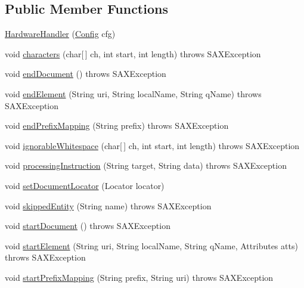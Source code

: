 \subsection*{Public Member Functions}
\begin{DoxyCompactItemize}
\item 
\hyperlink{classrob_o_s2_1_1xml_1_1handler_1_1_hardware_handler_aa8514b593a0c7be3522a4b004e7e2e4e}{HardwareHandler} (\hyperlink{classrob_o_s2_1_1serial_1_1_config}{Config} cfg)
\item 
void \hyperlink{classrob_o_s2_1_1xml_1_1handler_1_1_hardware_handler_a60a7c7ba374796c2732fdbdf9ddd7f20}{characters} (char\mbox{[}$\,$\mbox{]} ch, int start, int length)  throws SAXException 
\item 
void \hyperlink{classrob_o_s2_1_1xml_1_1handler_1_1_hardware_handler_a9007e3b376b3c8a12af0e14ba15040e7}{endDocument} ()  throws SAXException 
\item 
void \hyperlink{classrob_o_s2_1_1xml_1_1handler_1_1_hardware_handler_a431b96e478c956f8f794e2034914ed4e}{endElement} (String uri, String localName, String qName)  throws SAXException 
\item 
void \hyperlink{classrob_o_s2_1_1xml_1_1handler_1_1_hardware_handler_aeb272a87c0aa3201313a8255c5d5db78}{endPrefixMapping} (String prefix)  throws SAXException 
\item 
void \hyperlink{classrob_o_s2_1_1xml_1_1handler_1_1_hardware_handler_ae3f491bcbc509a3ce8d41327c0c7de8b}{ignorableWhitespace} (char\mbox{[}$\,$\mbox{]} ch, int start, int length)  throws SAXException 
\item 
void \hyperlink{classrob_o_s2_1_1xml_1_1handler_1_1_hardware_handler_ab6e363a0cf45c494d180f300fcdace79}{processingInstruction} (String target, String data)  throws SAXException 
\item 
void \hyperlink{classrob_o_s2_1_1xml_1_1handler_1_1_hardware_handler_a511ff39840db7c4e613f278a8e7a64bb}{setDocumentLocator} (Locator locator)
\item 
void \hyperlink{classrob_o_s2_1_1xml_1_1handler_1_1_hardware_handler_a0f73445204e562f8aa9993f1558a68f8}{skippedEntity} (String name)  throws SAXException 
\item 
void \hyperlink{classrob_o_s2_1_1xml_1_1handler_1_1_hardware_handler_aa215fef17a18ba9006911e3e89989a0d}{startDocument} ()  throws SAXException 
\item 
void \hyperlink{classrob_o_s2_1_1xml_1_1handler_1_1_hardware_handler_a84041339dc0d785a25b5aedcaa20d0ae}{startElement} (String uri, String localName, String qName, Attributes atts)  throws SAXException 
\item 
void \hyperlink{classrob_o_s2_1_1xml_1_1handler_1_1_hardware_handler_ae16600e692fca7eb878b5bcbb5812d45}{startPrefixMapping} (String prefix, String uri)  throws SAXException 
\end{DoxyCompactItemize}
